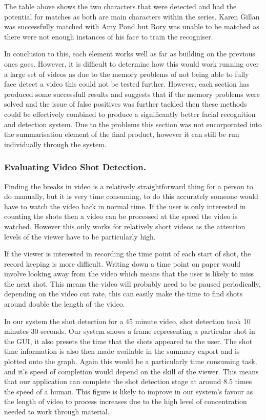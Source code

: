 The table above shows the two characters that were detected and had the potential for matches as both are main characters within the series. Karen Gillan was successfully matched with Amy Pond but Rory was unable to be matched as there were not enough instances of his face to train the recogniser. 

In conclusion to this, each element works well as far as building on the previous ones goes. However, it is difficult to determine how this would work running over a large set of videos as due to the memory problems of not being able to fully face detect a video this could not be tested further. However, each section has produced some successfull results and suggests that if the memory problems were solved and the issue of false positives was further tackled then these methods could be effectively combined to produce a significantly better facial recognition and detection system. Due to the problems this section was not encorporated into the summarisation element of the final product, however it can still be run individually through the system. 

\newpage
\subsubsection{Evaluating Video Shot Detection.}

Finding the breaks in video is a relatively straightforward thing for a person to do manually, but it is very time consuming, to do this accurately someone would have to watch the video back in normal time. If the user is only interested in counting the shots then a video can be processed at the speed the video is watched. However this only works for relatively short videos as the attention levels of the viewer have to be particularly high. 

If the viewer is interested in recording the time point of each start of shot, the record keeping is more difficult. Writing down a time point on paper would involve looking away from the video which means that the user is likely to miss the next shot.  This means the video will probably need to be paused periodically, depending on the video cut rate, this can easily make the time to find shots around double the length of the video.

In our system the shot detection for a 45 minute video, shot detection took 10 minutes 30 seconds. Our system shows a frame representing a particular shot in the GUI, it also presets the time that the shots appeared to the user. The shot time information is also then made available in the summary export and is plotted onto the graph. Again this would be a particularly time consuming task, and it’s speed of completion would depend on the skill of the viewer. This means that our application can complete the shot detection stage at around 8.5 times the speed of a human. This figure is likely to improve in our system’s favour as the length of video to process increases due to the high level of concentration needed to work through material.

